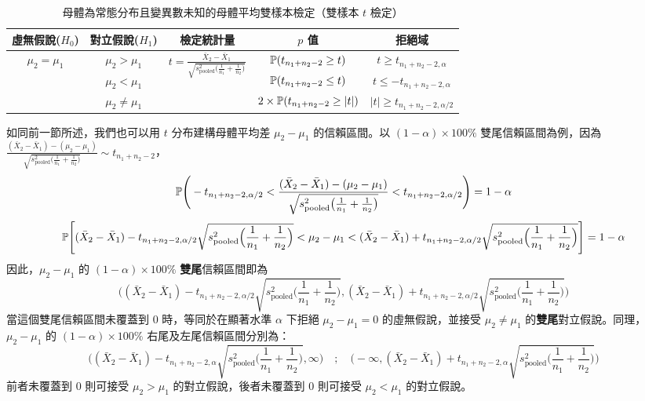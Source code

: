     \begin{table}[htbp]
        \begin{center}
            \begin{tabular}{ccccc}
                \toprule
                虛無假說($H_0$) & 對立假說($H_1$) & 檢定統計量 & $p$ 值 & 拒絕域\\
                \hline
                \multirow{3}{*}{$\mu_2 = \mu_1$} & $\mu_2 > \mu_1$ & \multirow{3}{*}{$t = \frac{\bar{X}_2-\bar{X}_1}{\sqrt{s_{\text{pooled}}^2\big(\frac{1}{n_1} + \frac{1}{n_2}\big)}}$} & $\mathbb{P}(t_{n_1+n_2-2} \ge t)$ & $t \ge t_{n_1+n_2-2,\alpha}$\\
                & $\mu_2 < \mu_1$ & &$\mathbb{P}(t_{n_1+n_2-2} \le t)$&$t \le -t_{n_1+n_2-2,\alpha}$\\
                & $\mu_2 \ne \mu_1$ & &$2\times\mathbb{P}(t_{n_1+n_2-2} \ge |t|)$&$|t| \ge t_{n_1+n_2-2,\alpha/2}$\\
                \bottomrule
            \end{tabular}
            \caption{母體為常態分布且變異數未知的母體平均雙樣本檢定（雙樣本 $t$ 檢定）\label{tab:two_sample_t}}
        \end{center}
    \end{table}

    如同前一節所述，我們也可以用 $t$ 分布建構母體平均差 $\mu_2 - \mu_1$ 的信賴區間。以 $(1-\alpha) \times 100\%$ 雙尾信賴區間為例，因為 $\frac{(\bar{X}_2-\bar{X}_1)-(\mu_2-\mu_1)}{\sqrt{s_{\text{pooled}}^2\big(\frac{1}{n_1} + \frac{1}{n_2}\big)}} \sim t_{n_1+n_2-2}$，
    \smallskip
    \[\mathbb{P}\Bigg(-t_{n_1+n_2-2,\alpha/2} < \frac{(\bar{X}_2-\bar{X}_1)-(\mu_2-\mu_1)}{\sqrt{s_{\text{pooled}}^2\big(\frac{1}{n_1} + \frac{1}{n_2}\big)}} < t_{n_1+n_2-2,\alpha/2}\Bigg) = 1-\alpha\]
    \[\mathbb{P}\Bigg[(\bar{X}_2-\bar{X}_1) - t_{n_1+n_2-2,\alpha/2} \sqrt{s_{\text{pooled}}^2\Big(\frac{1}{n_1} + \frac{1}{n_2}\Big)} < \mu_2-\mu_1  < (\bar{X}_2-\bar{X}_1) + t_{n_1+n_2-2,\alpha/2} \sqrt{s_{\text{pooled}}^2\Big(\frac{1}{n_1} + \frac{1}{n_2}\Big)}\Bigg] = 1-\alpha\]
    \smallskip
    因此，$\mu_2-\mu_1$ 的 $(1-\alpha) \times 100\%$ \textbf{雙尾}信賴區間即為
    \smallskip
    \[\Bigg((\bar{X}_2-\bar{X}_1) - t_{n_1+n_2-2,\alpha/2} \sqrt{s_{\text{pooled}}^2\Big(\frac{1}{n_1} + \frac{1}{n_2}\Big)}, (\bar{X}_2-\bar{X}_1) + t_{n_1+n_2-2,\alpha/2} \sqrt{s_{\text{pooled}}^2\Big(\frac{1}{n_1} + \frac{1}{n_2}\Big)}\Bigg)\]
    \smallskip
    當這個雙尾信賴區間未覆蓋到 $0$ 時，等同於在顯著水準 $\alpha$ 下拒絕 $\mu_2 - \mu_1 = 0$ 的虛無假說，並接受 $\mu_2 \ne \mu_1$ 的\textbf{雙尾}對立假說。同理，$\mu_2-\mu_1$ 的 $(1-\alpha) \times 100\%$ 右尾及左尾信賴區間分別為：
    \smallskip
    \[\Bigg((\bar{X}_2-\bar{X}_1) - t_{n_1+n_2-2,\alpha} \sqrt{s_{\text{pooled}}^2\Big(\frac{1}{n_1} + \frac{1}{n_2}\Big)}, \infty \Bigg)\quad ; \quad\Bigg(-\infty, (\bar{X}_2-\bar{X}_1) + t_{n_1+n_2-2,\alpha} \sqrt{s_{\text{pooled}}^2\Big(\frac{1}{n_1} + \frac{1}{n_2}\Big)} \Bigg)\]
    \smallskip
    前者未覆蓋到 $0$ 則可接受 $\mu_2 > \mu_1$ 的對立假說，後者未覆蓋到 $0$ 則可接受 $\mu_2 < \mu_1$ 的對立假說。

